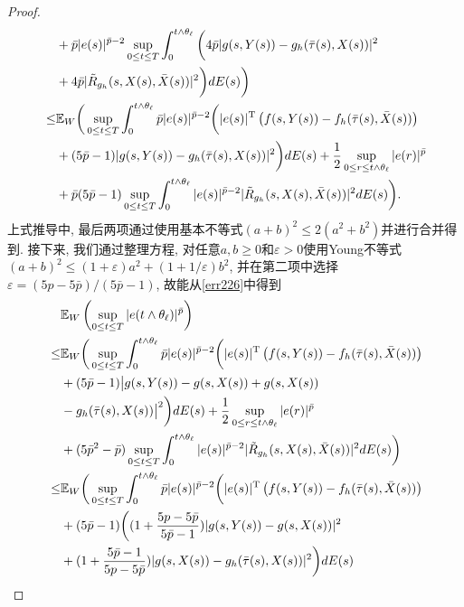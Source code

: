 \begin{proof}
\begin{align}
    \quad &+\bar{p}|e(s)|^{\bar{p}-2}\sup_{0\leq t\leq T}\int^{t\wedge\theta_{\ell}}_{0}\bigg(4\bar{p}|g(s,Y(s))-g_{h}(\bar{\tau}(s),X(s))|^{2}\nonumber\\
    \quad&
    +4\bar{p}|\tilde{R}_{g_h}(s,X(s),\bar{X}(s))|^2\bigg)dE(s)\bigg)\nonumber\\
    \leq&\mathbb{E}_W\bigg(\sup_{0\leq t\leq T}\int^{t\wedge\theta_{\ell}}_{0}\bar{p}|e(s)|^{\bar{p}-2}\bigg(|e(s)|^{\mathrm{T}}\left(f(s,Y(s))-f_{h}(\bar{\tau}(s),\bar{X}(s))\right)\nonumber\\
    \quad& +(5\bar{p}-1)|g(s,Y(s))-g_{h}(\bar{\tau}(s),X(s))|^{2}\bigg)dE(s)+\frac{1}{2}\sup_{0\leq r\leq t\wedge\theta_{\ell}}|e(r)|^{\bar{p}}\nonumber\\
    \quad&
    +\bar{p}(5\bar{p}-1)\sup_{0\leq t\leq T}\int^{t\wedge\theta_{\ell}}_{0}|e(s)|^{\bar{p}-2} |\tilde{R}_{g_h}(s,X(s),\bar{X}(s))|^2dE(s)\bigg).   
\end{align}
上式推导中, 最后两项通过使用基本不等式$(a+b)^{2}\leq2(a^{2}+b^{2})$并进行合并得到.
接下来, 我们通过整理方程, 对任意$a,b\geq 0$和$ \varepsilon>0$使用Young不等式$(a+b)^{2}\leq (1+\varepsilon)a^{2}+(1+1/\varepsilon)b^{2}$, 并在第二项中选择$ \varepsilon =(5p-5\bar{p})/(5\bar{p}-1)$, 故能从\eqref{err226}中得到
\begin{align}
    \label{err2}
    &\EE_W\left(\sup_{0\leq t\leq T}|e(t\wedge \theta_{\ell})|^{\bar{p}}\right)\nonumber\\
    \leq&\EE_W\bigg(\sup_{0\leq t\leq T}\int^{t\wedge\theta_{\ell}}_{0}\bar{p}|e(s)|^{\bar{p}-2}\bigg(|e(s)|^{\mathrm{T}}\left(f(s,Y(s))-f_{h}(\bar{\tau}(s),\bar{X}(s))\right)\nonumber\\
    \quad& +(5\bar{p}-1)\big|g(s,Y(s))-g(s,X(s))+g(s,X(s))\nonumber\\
    \quad&
    -g_{h}(\bar{\tau}(s),X(s))\big|^{2}\bigg)dE(s)+\frac{1}{2}\sup_{0\leq r\leq t\wedge\theta_{\ell}}|e(r)|^{\bar{p}}\nonumber\\
    \quad&+(5{\bar{p}}^{2}-\bar{p})\sup_{0\leq t\leq T}\int^{t\wedge\theta_{\ell}}_{0}|e(s)|^{\bar{p}-2}|\tilde{R}_{g_h}(s,X(s),\bar{X}(s))|^2dE(s)\bigg)\nonumber\\
    \leq&\EE_W\bigg(\sup_{0\leq t\leq T}\int^{t\wedge\theta_{\ell}}_{0}\bar{p}|e(s)|^{\bar{p}-2}\bigg(|e(s)|^{\mathrm{T}}\left(f(s,Y(s))-f_{h}(\bar{\tau}(s),\bar{X}(s))\right)\nonumber\\
    \quad& +(5\bar{p}-1)\bigg((1+\dfrac{5p-5\bar{p}}{5\bar{p}-1})|g(s,Y(s))-g(s,X(s))|^{2}\nonumber\\
    \quad&
    +(1+\dfrac{5\bar{p}-1}{5p-5\bar{p}})|g(s,X(s))-g_{h}(\bar{\tau}(s),X(s))|^{2}\bigg)dE(s)\nonumber\\

\end{align}
\end{proof}
